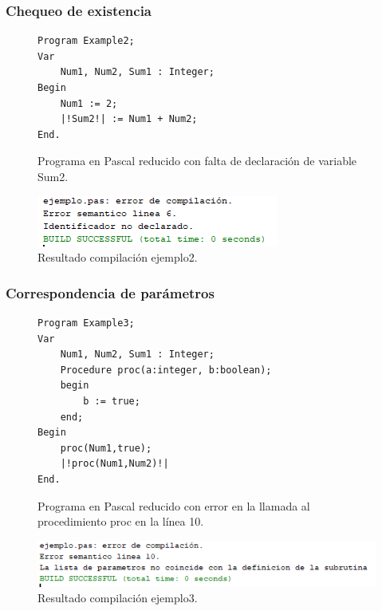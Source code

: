 \subsubsection{Chequeo de existencia}
\begin{figure}[H]
\begin{verbatim}
Program Example2;
Var       
    Num1, Num2, Sum1 : Integer;
Begin 
    Num1 := 2;
    |!Sum2!| := Num1 + Num2;
End.
\end{verbatim}
\caption{Programa en Pascal reducido con falta de declaración de variable Sum2.}
\label{fig:semantico_ej_error_2}
\end{figure}

\begin{figure}[H]
\centering
\includegraphics[]{img/semantico/semantico_ej2.png}
\caption{Resultado compilación ejemplo2.}
\label{fig:semantico_ej2}
\end{figure}

\subsubsection{Correspondencia de parámetros}
\begin{figure}[H]
\begin{verbatim}
Program Example3;
Var       
    Num1, Num2, Sum1 : Integer;
    Procedure proc(a:integer, b:boolean);
    begin
        b := true;
    end;
Begin
    proc(Num1,true);
    |!proc(Num1,Num2)!|
End.
\end{verbatim}
\caption{Programa en Pascal reducido con error en la llamada al procedimiento proc en la línea 10.}
\label{fig:semantico_ej_error_3}
\end{figure}

\begin{figure}[H]
\centering
\includegraphics[]{img/semantico/semantico_ej3.png}
\caption{Resultado compilación ejemplo3.}
\label{fig:semantico_ej3}
\end{figure}

